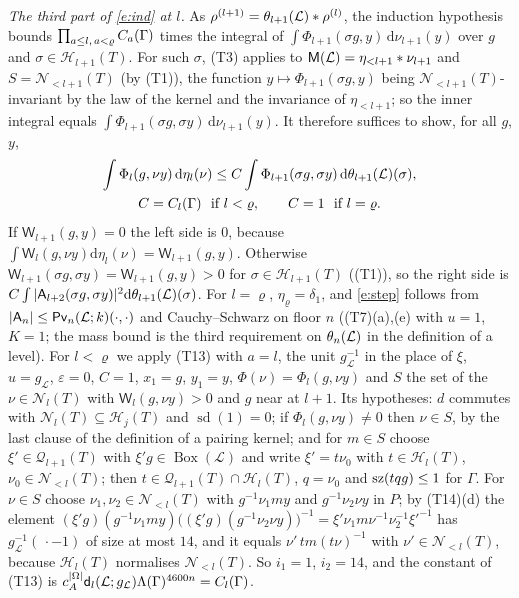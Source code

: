 \documentclass[11pt,a4paper]{article}
\makeatletter
\newcommand{\m}[1]{\mbox{$#1$}}        %
\theoremstyle{plainx}
\theoremstyle{uprightx}
\renewenvironment{proof}[1][Proof]{\par\pushQED{\qed}\normalfont\topsep0pt\partopsep0pt
  \trivlist\item[\hskip\labelsep\itshape #1.]\ignorespaces}{\popQED\endtrivlist\@endpefalse}
\newcommand{\cL}{\mathcal{L}}
\newcommand{\dd}{\mathrm{d}}
\newcommand{\Hl}[2]{\mathcal{H}_{#1}(#2)}
\newcommand{\Ql}[2]{\mathcal{Q}_{#1}(#2)}
\newcommand{\Nb}[2]{\mathcal{N}_{<#1}(#2)}
\newcommand{\Nf}[2]{\mathcal{N}_{#1}(#2)}
\newcommand{\sd}{\operatorname{sd}}
\newcommand{\gL}[1]{g_{#1}}
\newcommand{\BoxL}[1]{\operatorname{Box}(#1)}
\newcommand{\etab}[1]{\eta_{<#1}}
\newcommand{\Inp}[1]{\textup{(#1)}}
\makeatother
\begin{document}
\begin{proof}[Proof of Theorem C]
\emph{The third part of \eqref{e:ind} at $l$.} As $\rho^{(l+1)}=\floorMeasure{\cL}{l+1}*\rho^{(l)}$, the induction
hypothesis bounds $\prod_{a\le l,\,a<\varrho}C_{a}(\Gamma)$ times the integral of
$\int\Phi_{l+1}(\sigma g,y)\,\dd\nu_{l+1}(y)$ over $g$ and $\sigma\in\Hl{l+1}{T}$. For such $\sigma$, \Inp{T3}
applies to $\groupMeasure{\cL}=\etab{l+1}*\nu_{l+1}$ and $S=\Nb{l+1}{T}$ (by \Inp{T1}), the function
$y\mapsto\Phi_{l+1}(\sigma g,y)$ being $\Nb{l+1}{T}$-invariant by the law of the kernel and the invariance of
$\etab{l+1}$; so the inner integral equals $\int\Phi_{l+1}(\sigma g,\sigma y)\,\dd\nu_{l+1}(y)$. It therefore
suffices to show, for all $g$, $y$,
\begin{equation}\label{e:step}\begin{gathered}
\int\Phi_l(g,\nu y)\,\dd\eta_l(\nu)\le C\int\Phi_{l+1}(\sigma g,\sigma y)\,\dd\floorMeasure{\cL}{l+1}(\sigma),\\
C=\floorConst{\Gamma}{l}\ \text{ if }l<\varrho,\qquad C=1\ \text{ if }l=\varrho.
\end{gathered}\end{equation}
If $\mathsf{W}_{l+1}(g,y)=0$ the left side is $0$, because $\int\mathsf{W}_l(g,\nu y)\dd\eta_l(\nu)=\mathsf{W}_{l+1}(g,y)$.
Otherwise $\mathsf{W}_{l+1}(\sigma g,\sigma y)=\mathsf{W}_{l+1}(g,y)>0$ for $\sigma\in\Hl{l+1}{T}$ (\Inp{T1}), so
the right side is $C\int|\mathsf{A}_{l+2}(\sigma g,\sigma y)|^2\dd\floorMeasure{\cL}{l+1}(\sigma)$. For $l=\varrho$,
$\eta_\varrho=\delta_1$, and \eqref{e:step} follows from $|\mathsf{A}_{n}|\le\pivotModulus{\cL}{n}{k}{\cdot}{\cdot}$
and Cauchy--Schwarz on floor $n$ (\Inp{T7}(a),(e) with $u=1$, $K=1$; the mass bound is the third requirement on
$\floorMeasure{\cL}{n}$ in the definition of a level). For $l<\varrho$ we apply \Inp{T13} with $a=l$, the unit
$\gL{\cL}^{-1}$ in the place of $\xi$, $u=\gL{\cL}$, $\varepsilon=0$, $C=1$, $x_1=g$, $y_1=y$,
$\Phi(\nu)=\Phi_l(g,\nu y)$ and $S$ the set of the $\nu\in\Nf{l}{T}$ with $\mathsf{W}_l(g,\nu y)>0$ and $g$ near at
$l+1$. Its hypotheses: $d$ commutes with $\Nf{l}{T}\subseteq\Hl{j}{T}$ and $\sd(1)=0$; if $\Phi_l(g,\nu y)\ne0$
then $\nu\in S$, by the last clause of the definition of a pairing kernel; and for $m\in S$ choose
$\xi'\in\Ql{l+1}{T}$ with $\xi'g\in\BoxL{\cL}$ and write $\xi'=t\nu_0$ with $t\in\Hl{l}{T}$,
$\nu_0\in\Nb{l}{T}$; then $t\in\Ql{l+1}{T}\cap\Hl{l}{T}$, $q=\nu_0$ and \m{\HasMatSize{1}{tqg}} for $\Gamma$. For
$\nu\in S$ choose $\nu_1,\nu_2\in\Nb{l}{T}$ with $g^{-1}\nu_1my$ and $g^{-1}\nu_2\nu y$ in $P$; by \Inp{T14}(d) the
element $(\xi'g)(g^{-1}\nu_1my)\bigl((\xi'g)(g^{-1}\nu_2\nu y)\bigr)^{-1}=\xi'\nu_1m\nu^{-1}\nu_2^{-1}\xi'^{-1}$ has
$\gL{\cL}^{-1}(\,\cdot-1)$ of size at most $14$, and it equals $\nu'\,tm(t\nu)^{-1}$ with
$\nu'\in\Nb{l}{T}$, because $\Hl{l}{T}$ normalises $\Nb{l}{T}$. So $i_1=1$, $i_2=14$, and the constant of \Inp{T13} is
$c_A^{|\Omega|}\floorModulus{\cL}{l}{\gL{\cL}}\Lambda(\Gamma)^{4600n}=\floorConst{\Gamma}{l}$.


\end{proof}
\end{document}
